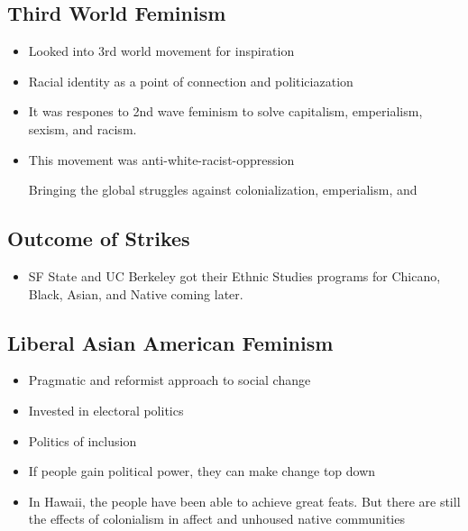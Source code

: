 \documentclass{article}
\begin{document}
\subsection{Third World Feminism}
\begin{itemize}
  \item Looked into 3rd world movement for inspiration
  \item Racial identity as a point of connection
    and politiciazation
  \item It was respones to 2nd wave feminism to solve
    capitalism, emperialism, sexism, and racism.
  \item This movement was anti-white-racist-oppression

    Bringing the global struggles against colonialization, emperialism, and
\end{itemize}

\subsection{Outcome of Strikes}
\begin{itemize}
  \item SF State and UC Berkeley got their Ethnic Studies programs
    for Chicano, Black, Asian, and Native coming later.
\end{itemize}

\subsection{Liberal Asian American Feminism}
\begin{itemize}
  \item Pragmatic and reformist approach to social change
  \item Invested in electoral politics 
  \item Politics of inclusion
  \item If people gain political power, they can make change top down
  \item In Hawaii, the people have been able to achieve great feats.
    But there are still the effects of colonialism in affect and unhoused native communities
\end{itemize}
\end{document}
